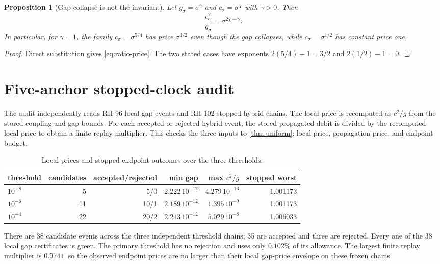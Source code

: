 \documentclass[11pt]{article}
\newtheorem{proposition}[theorem]{Proposition}
\theoremstyle{definition}
\theoremstyle{remark}
\begin{document}
\begin{proposition}[Gap collapse is not the invariant]
 \label{prop:ratio}
 Let $g_\sigma=\sigma^\gamma$ and $c_\sigma=\sigma^\chi$ with $\gamma>0$.
 Then
 \begin{equation}
 \frac{c_\sigma^2}{g_\sigma}=\sigma^{2\chi-\gamma}.
 \label{eq:ratio-price}
 \end{equation}
 In particular, for $\gamma=1$, the family $c_\sigma=\sigma^{5/4}$ has
 price $\sigma^{3/2}$ even though the gap collapses, while
 $c_\sigma=\sigma^{1/2}$ has constant price one.
\end{proposition}

\begin{proof}
 Direct substitution gives \eqref{eq:ratio-price}.  The two stated cases
 have exponents $2(5/4)-1=3/2$ and $2(1/2)-1=0$.
\end{proof}

\section{Five-anchor stopped-clock audit}
\label{sec:audit}

The audit independently reads RH-96 local gap events and RH-102 stopped
hybrid chains.  The local price is recomputed as $c^2/g$ from the stored
coupling and gap bounds.  For each accepted or rejected hybrid event, the
stored propagated debit is divided by the recomputed local price to obtain a
finite replay multiplier.  This checks the three inputs to
\cref{thm:uniform}: local price, propagation price, and endpoint budget.

\begin{table}[H]
\centering
\small
\caption{Local prices and stopped endpoint outcomes over the three thresholds.}
\label{tab:audit}
\begin{tabular}{@{}lrrrrr@{}}
\toprule
threshold & candidates & accepted/rejected & min gap & max $c^2/g$ & stopped worst\\
\midrule
$10^{-8}$ & 5  & 5/0  & $2.222\,10^{-12}$ & $4.279\,10^{-13}$ & 1.001173\\
$10^{-6}$ & 11 & 10/1 & $2.189\,10^{-12}$ & $1.395\,10^{-9}$ & 1.001173\\
$10^{-4}$ & 22 & 20/2 & $2.213\,10^{-12}$ & $5.029\,10^{-8}$ & 1.006033\\
\bottomrule
\end{tabular}
\end{table}

There are 38 candidate events across the three independent threshold chains;
35 are accepted and three are rejected.  Every one of the 38 local gap
certificates is green.  The primary threshold has no rejection and uses only
$0.102\%$ of its allowance.  The largest finite replay multiplier is
$0.9741$, so the observed endpoint prices are no larger than their local
gap-price envelope on these frozen chains.
\end{document}
